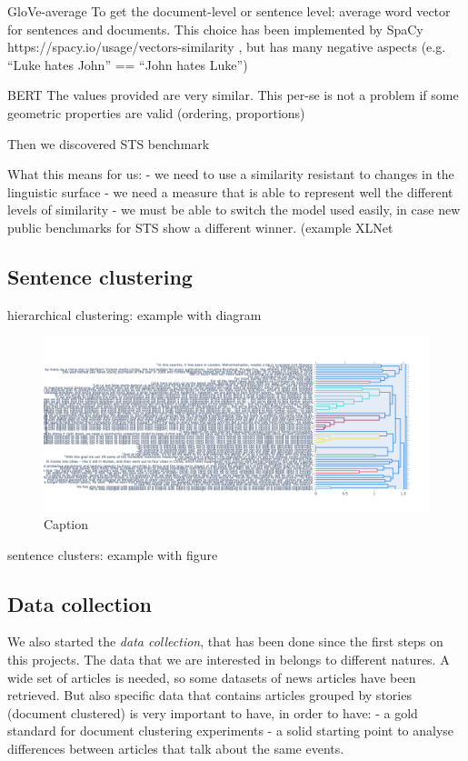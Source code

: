 GloVe-average
To get the document-level or sentence level: average word vector for sentences and documents. This choice has been implemented by SpaCy https://spacy.io/usage/vectors-similarity , but has many negative aspects (e.g. “Luke hates John” == “John hates Luke”) 

BERT
The values provided are very similar. This per-se is not a problem if some geometric properties are valid (ordering, proportions)


Then we discovered STS benchmark

What this means for us:
- we need to use a similarity resistant to changes in the linguistic surface
- we need a measure that is able to represent well the different levels of similarity
- we must be able to switch the model used easily, in case new public benchmarks for STS show a different winner. (example XLNet~\cite{yang2019xlnet}


\subsection{Sentence clustering}


hierarchical clustering: example with diagram
\begin{figure}[!htb]
    \centering
    \includegraphics[width=\linewidth]{figures/dendrogram.png}
    \caption{Caption}
    \label{fig:my_label}
\end{figure}

sentence clusters: example with figure



\subsection{Data collection}
We also started the \emph{data collection}, that has been done since the first steps on this projects.
The data that we are interested in belongs to different natures.
A wide set of articles is needed, so some datasets of news articles have been retrieved.
But also specific data that contains articles grouped by stories (document clustered) is very important to have, in order to have:
- a gold standard for document clustering experiments
- a solid starting point to analyse differences between articles that talk about the same events.

